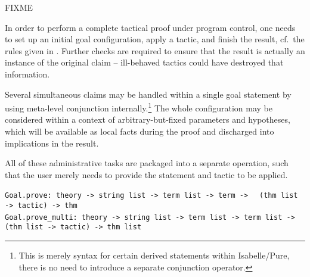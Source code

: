 \begin{isabellebody}
\begin{isamarkuptext}
%
\end{isamarkuptext}%
\isamarkuptrue%
%
\isamarkuptrue%
%
\begin{isamarkuptext}%
FIXME

%
\end{isamarkuptext}%
\isamarkuptrue%
%
\isamarkuptrue%
%
\begin{isamarkuptext}%
In order to perform a complete tactical proof under program control,
  one needs to set up an initial goal configuration, apply a tactic,
  and finish the result, cf.\ the rules given in
  .  Further checks are required to ensure
  that the result is actually an instance of the original claim --
  ill-behaved tactics could have destroyed that information.

  Several simultaneous claims may be handled within a single goal
  statement by using meta-level conjunction internally.\footnote{This
  is merely syntax for certain derived statements within
  Isabelle/Pure, there is no need to introduce a separate conjunction
  operator.}  The whole configuration may be considered within a
  context of arbitrary-but-fixed parameters and hypotheses, which will
  be available as local facts during the proof and discharged into
  implications in the result.

  All of these administrative tasks are packaged into a separate
  operation, such that the user merely needs to provide the statement
  and tactic to be applied.%
\end{isamarkuptext}%
\isamarkuptrue%
%
\isadelimmlref
%
\endisadelimmlref
%
\isatagmlref
%
\begin{isamarkuptext}%
\begin{mldecls}
  \verb|Goal.prove: theory -> string list -> term list -> term ->|\isasep\isanewline%
\verb|  (thm list -> tactic) -> thm| \\
  \verb|Goal.prove_multi: theory -> string list -> term list -> term list ->|\isasep\isanewline%
\verb|  (thm list -> tactic) -> thm list| \\
  \end{mldecls}


\end{isamarkuptext}
\end{isabellebody}
